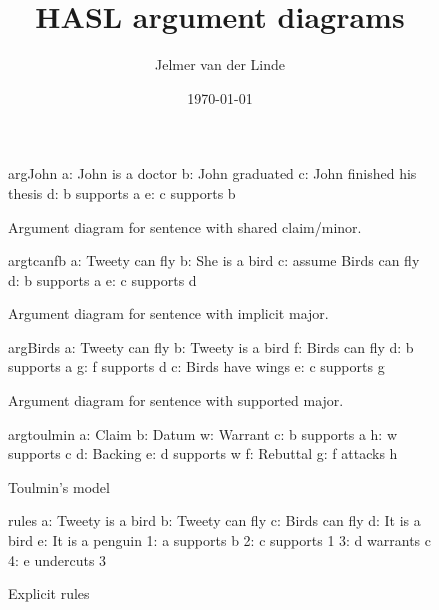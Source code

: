 \documentclass[a4paper]{article}
\begin{document}
\title{HASL argument diagrams}
\author{Jelmer van der Linde}
\date{\today}

\maketitle

\newpage

\begin{figure}
	\begin{haslpicture}[width=0.5\textwidth]{argJohn}
		a: John is a doctor
		b: John graduated
		c: John finished his thesis
		d: b supports a
		e: c supports b
	\end{haslpicture}
	\caption{Argument diagram for sentence with shared claim/minor.}
	\label{fig:argJohn}
\end{figure}

\begin{figure}
	\begin{haslpicture}[width=0.5\textwidth]{argtcanfb}
		a: Tweety can fly
		b: She is a bird
		c: assume Birds can fly
		d: b supports a
		e: c supports d
	\end{haslpicture}
	\caption{Argument diagram for sentence with implicit major.}
	\label{fig:argTcanFB}
\end{figure}

\begin{figure}
	\begin{haslpicture}[width=0.5\textwidth]{argBirds}
		a: Tweety can fly
		b: Tweety is a bird
		f: Birds can fly
		d: b supports a
		g: f supports d
		c: Birds have wings
		e: c supports g
	\end{haslpicture}
	\caption{Argument diagram for sentence with supported major.}
	\label{fig:argBirds}
\end{figure}

\begin{figure}
	\centering
	\begin{haslpicture}[width=\textwidth]{argtoulmin}
		a: Claim
		b: Datum
		w: Warrant
		c: b supports a
		h: w supports c
		d: Backing
		e: d supports w
		f: Rebuttal
		g: f attacks h
	\end{haslpicture}
	\caption{Toulmin's model}
	\label{fig:argtoulmin}
\end{figure}

\begin{figure}
	\centering
	\begin{haslpicture}[width=\textwidth]{rules}
		a: Tweety is a bird
		b: Tweety can fly
		c: Birds can fly
		d: It is a bird
		e: It is a penguin
		1: a supports b
		2: c supports 1
		3: d warrants c
		4: e undercuts 3
	\end{haslpicture}
	\caption{Explicit rules}
	\label{fig:argrules}
\end{figure}
\end{document}

